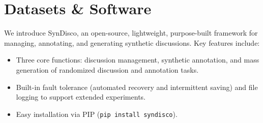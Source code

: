 \section{Datasets \& Software}
\label{sec:data-soft}

We introduce SynDisco, an open-source, lightweight, purpose-built framework for managing, annotating, and generating synthetic discussions. Key features include: 
\begin{itemize}[nosep, noitemsep]
    \item  Three core functions: discussion management, synthetic annotation, and mass generation of randomized discussion and annotation tasks.
    \item  Built-in fault tolerance (automated recovery and intermittent saving) and file logging to support extended experiments.
    \item Easy installation via PIP (\texttt{pip install syndisco}).
\end{itemize}     

